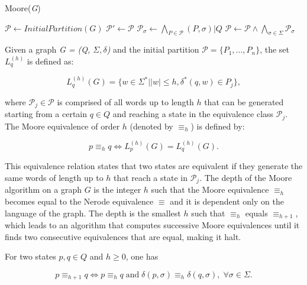 {\begin{algorithm} [b]
  \caption{Moore(\textit{G})\label{alg:moore}}
    \begin{algorithmic}[1]
      \State $\mathcal{P} \leftarrow InitialPartition(G)$
      \Repeat
      	\State $\mathcal{P}' \leftarrow \mathcal{P}$
      	\ForAll{$\sigma \in \Sigma$}
      		\State $\mathcal{P}_{\sigma} \leftarrow \bigwedge_{P\in \mathcal{P}}(P,\sigma)|Q$
      	\EndFor
      	\State $\mathcal{P} \leftarrow \mathcal{P}\wedge\bigwedge_{\sigma\in\Sigma}\mathcal{P}_{\sigma}$
    \end{algorithmic}
  \end{algorithm}
 
Given a graph \textit{G = (Q, $\Sigma, \delta$)} and the initial partition $\mathcal{P} = \{P_1,\ldots, P_n\}$, the set $L_q^{(h)}$ is defined as:

\[
L_q^{(h)}(G) = \{w \in \Sigma^* | |w| \leq h, \delta^*(q,w) \in P_j\},
\]

\noindent where $\mathcal{P}_j \in \mathcal{P}$  is comprised of all words up to length $h$ that can be generated starting from a certain $q \in Q$ and reaching a state in the equivalence class $\mathcal{P}_j$. The Moore equivalence of order $h$ (denoted by $\equiv_h$) is defined by:

\[
p \equiv_h q \Leftrightarrow L_p^{(h)}(G) = L_q^{(h)}(G).
\]

\noindent This equivalence relation states that two states are equivalent if they generate the same words of length up to $h$ that reach a state in $\mathcal{P}_j$. The depth of the Moore algorithm on a graph $G$ is the integer $h$ such that the Moore equivalence $\equiv_h$ becomes equal to the Nerode equivalence $\equiv$ and it is dependent only on the language of the graph. The depth is the smallest $h$ such that $\equiv_h$ equals $\equiv_{h+1}$, which leads to an algorithm that computes successive Moore equivalences until it finds two consecutive equivalences that are equal, making it halt.

\begin{proposition}\label{prop:makemooreeasy}
For two states $p, q \in Q$ and $h \geq 0$, one has

\end{proposition}

\begin{equation}\label{eq:mooreequiv}
p \equiv_{h+1} q \Longleftrightarrow p \equiv_{h} q\; \text{and} \;\delta(p,\sigma) \equiv_h \delta(q,\sigma), \; \forall \sigma \in \Sigma.
\end{equation}

}

